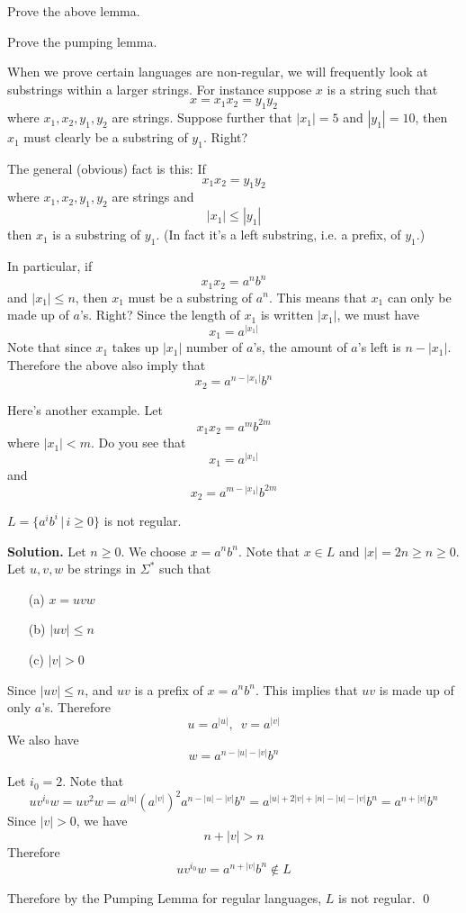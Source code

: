 \begin{ex}
Prove the above lemma.
\end{ex}

\begin{ex}
Prove the pumping lemma.
\end{ex}




\newpage
When we prove certain languages are non-regular, 
we will frequently look at substrings within a larger strings. 
For instance suppose $x$ is a string such that
\[
x = x_1 x_2 = y_1 y_2
\]
where $x_1, x_2, y_1, y_2$ are strings.
Suppose further that $|x_1| = 5$ and $|y_1| = 10$,
then $x_1$ must clearly be a substring of $y_1$.
Right?

The general (obvious) fact is this:
If 
\[
x_1 x_2 = y_1 y_2
\]
where $x_1, x_2, y_1, y_2$ are strings and 
\[
|x_1| \leq |y_1|
\]
then $x_1$ is a substring of $y_1$.
(In fact it's a left substring, i.e. a prefix, of $y_1$.)


In particular, if
\[
x_1 x_2 = a^n b^n
\]
and $|x_1| \leq n$, then $x_1$ must be a substring of $a^n$.
This means that $x_1$ can only be made up of $a$'s.
Right?
Since the length of $x_1$ is written $|x_1|$, we must have
\[
x_1 = a^{|x_1|}
\]
Note that since $x_1$ takes up $|x_1|$ number of 
$a$'s, the amount of $a$'s left is $n - |x_1|$.
Therefore the above also imply that
\[
x_2 = a^{n - |x_1|} b^n
\]

Here's another example.
Let 
\[
x_1 x_2 = a^m b^{2m} 
\]
where $|x_1| < m$.
Do you see that
\[
x_1 = a^{|x_1|}
\]
and
\[
x_2 = a^{m - |x_1|} b^{2m}
\]

\newpage
\begin{eg}
 $L = \{a^ib^i \,|\, i\geq 0 \}$ is not regular.

\textbf{Solution.}
Let $n \geq 0$. We choose $x = a^nb^n$. Note that $x \in
L$ and $|x| = 2n \geq n \geq 0$. 
Let $u,v,w$ be strings in $\Sigma^*$ such that
\begin{enumerate}[label=\textnormal{(\alph*)},itemsep=0pt,nosep,noitemsep,partopsep=0pt,topsep=0pt,parsep=0pt]
 \item[(a)] $x = uvw$
 \item[(b)] $|uv| \leq n$
 \item[(c)] $|v| > 0$
\end{enumerate}

Since $|uv| \leq n$, and $uv$ is a prefix of $x = a^n b^n$.
This implies that $uv$ is made up of only $a$'s.
Therefore 
\[
u = a^{|u|}, \,\,\, v = a^{|v|}
\]
We also have 
\[
w = a^{n-|u|-|v|}b^n
\]

Let $i_0 = 2$. 
Note that
\[
u v^{i_0} w 
= uv^2w 
= a^{|u|} (a^{|v|})^2 a^{n - |u| - |v|}b^n 
= a^{|u|+2|v| + |n| - |u|- |v|}b^n = a^{n+|v|}b^n
\]
Since
$|v|>0$, we have
\[
n+|v| > n
\]
Therefore 
\[
uv^{i_0}w = a^{n+|v|}b^n \notin L
\]

Therefore by the Pumping Lemma for regular languages, $L$ is not
regular.
\qed
\end{eg}



